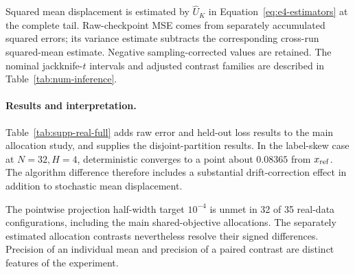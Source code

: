 Squared mean displacement is estimated by $\widehat U_K$ in
Equation~\eqref{eq:e4-estimators} at the complete tail. Raw-checkpoint
MSE comes from separately accumulated squared errors; its variance estimate
subtracts the corresponding cross-run squared-mean estimate. Negative
sampling-corrected values are retained. The nominal jackknife-$t$ intervals
and adjusted contrast families are described in Table~\ref{tab:num-inference}.

\paragraph{Results and interpretation.}
Table~\ref{tab:supp-real-full} adds raw error and held-out loss results
to the main allocation study, and supplies the disjoint-partition results.
In the label-skew case at $N=32,H=4$, deterministic \FedAvg{} converges
to a point about $0.08365$ from $x_{\rm ref}$. The algorithm difference
therefore includes a substantial drift-correction effect in addition to
stochastic mean displacement.

The pointwise projection half-width target $10^{-4}$ is unmet in 32 of
35 real-data configurations, including the main shared-objective
allocations. The separately estimated allocation contrasts nevertheless
resolve their signed differences. Precision of an individual mean and
precision of a paired contrast are distinct features of the experiment.

